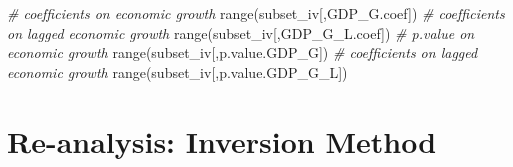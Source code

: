 \documentclass[
]{article}
\newenvironment{Shaded}{\begin{snugshade}}{\end{snugshade}}
\newcommand{\CommentTok}[1]{\textcolor[rgb]{0.56,0.35,0.01}{\textit{#1}}}
\newcommand{\FunctionTok}[1]{\textcolor[rgb]{0.00,0.00,0.00}{#1}}
\newcommand{\NormalTok}[1]{#1}
\newcommand{\StringTok}[1]{\textcolor[rgb]{0.31,0.60,0.02}{#1}}
\begin{document}
\begin{Shaded}
\begin{Highlighting}[]
\CommentTok{\# coefﬁcients on economic growth}
\FunctionTok{range}\NormalTok{(subset\_iv[,}\StringTok{\textquotesingle{}GDP\_G.coef\textquotesingle{}}\NormalTok{])}
\CommentTok{\# coefﬁcients on lagged economic growth}
\FunctionTok{range}\NormalTok{(subset\_iv[,}\StringTok{\textquotesingle{}GDP\_G\_L.coef\textquotesingle{}}\NormalTok{])}
\CommentTok{\# p.value on economic growth }
\FunctionTok{range}\NormalTok{(subset\_iv[,}\StringTok{\textquotesingle{}p.value.GDP\_G\textquotesingle{}}\NormalTok{])}
\CommentTok{\# coefﬁcients on lagged economic growth}
\FunctionTok{range}\NormalTok{(subset\_iv[,}\StringTok{\textquotesingle{}p.value.GDP\_G\_L\textquotesingle{}}\NormalTok{])}
\end{Highlighting}
\end{Shaded}

\hypertarget{re-analysis-inversion-method}{%
\section{Re-analysis: Inversion
Method}\label{re-analysis-inversion-method}}
\end{document}
